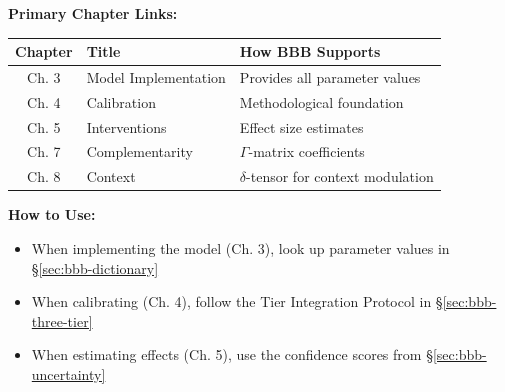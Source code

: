 \documentclass[11pt,a4paper]{article}
\theoremstyle{definition}
\begin{document}
\begin{tcolorbox}[colback=blue!5!white, colframe=blue!75!black, 
    title=\textbf{Chapter Linkages}]

\textbf{Primary Chapter Links:}

\begin{center}
\begin{tabular}{@{}clp{7cm}@{}}
\toprule
\textbf{Chapter} & \textbf{Title} & \textbf{How BBB Supports} \\
\midrule
Ch. 3 & Model Implementation & Provides all parameter values \\
Ch. 4 & Calibration & Methodological foundation \\
Ch. 5 & Interventions & Effect size estimates \\
Ch. 7 & Complementarity & $\Gamma$-matrix coefficients \\
Ch. 8 & Context & $\delta$-tensor for context modulation \\
\bottomrule
\end{tabular}
\end{center}

\textbf{How to Use:}
\begin{itemize}[nosep]
    \item When implementing the model (Ch. 3), look up parameter values in \S\ref{sec:bbb-dictionary}
    \item When calibrating (Ch. 4), follow the Tier Integration Protocol in \S\ref{sec:bbb-three-tier}
    \item When estimating effects (Ch. 5), use the confidence scores from \S\ref{sec:bbb-uncertainty}
\end{itemize}

\end{tcolorbox}

\end{document}
